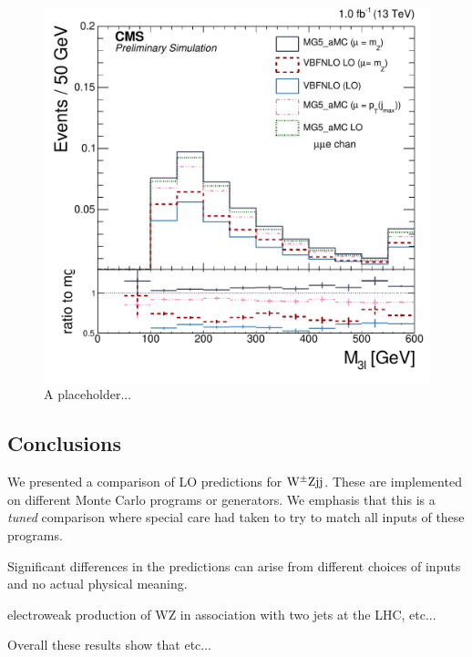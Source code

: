 \documentclass[11pt]{cernrep}
\begin{document}
\begin{figure}[htbp]
\begin{center}
   \includegraphics[scale=0.65]{figs/3lmass.pdf}
\caption{A placeholder...}
\label{vbs_fig1}
\end{center}
\end{figure}

\subsection{Conclusions \label{concl}}

We presented a comparison of LO predictions for ${\rm W}^{\pm}{\rm Z}{\rm j}{\rm j}$.
These are implemented on different Monte Carlo programs or generators.
We emphasis that this is a \emph{tuned} comparison where special care had taken to try to match all inputs of these programs.

Significant differences in the predictions can arise from different choices of inputs and no actual physical meaning.

electroweak production of WZ in association with two jets at the LHC, etc... 

Overall these results show that etc...


\end{document}
